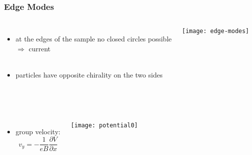 \begin{frame}
\frametitle{Edge Modes}
\begin{columns}
	\column[]{6cm}
	\begin{itemize}
		\item at the edges of the sample no closed circles possible\\
		$\Rightarrow$ current\\\ \\
		
		\item particles have opposite chirality on the two sides\\\ \\\ \\
		
		

		
		
	
		
		
	\end{itemize}

	\column[]{6cm}
	\texttt{[image: edge-modes]}
	
\end{columns}
\pause
\begin{columns}
	\column[]{6cm}
	\begin{itemize}
 		\item group velocity:
 		\begin{equation*}
 		v_y = -\dfrac{1}{eB} \dfrac{\partial V}{\partial x}
 		\end{equation*}
 	\end{itemize}
 
 
	\column[]{6cm}
	
	\texttt{[image: potential0]}
	\ \\
	
\end{columns}

\end{frame}

